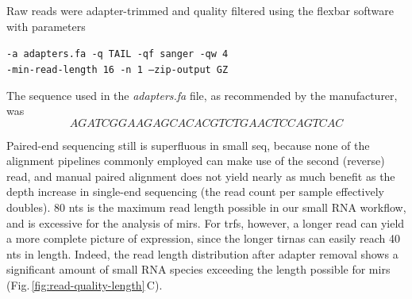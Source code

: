 \begin{method}

Raw reads were adapter-trimmed and quality filtered using the flexbar software\cite{Roehr2017} with parameters

\begin{center}\texttt{-a adapters.fa -q TAIL -qf sanger -qw 4 \\-min-read-length 16 -n 1 --zip-output GZ}\end{center} 

The sequence used in the \textit{adapters.fa} file, as recommended by the manufacturer, was $$AGATCGGAAGAGCACACGTCTGAACTCCAGTCAC$$ 

Paired-end sequencing still is superfluous in small \ac{seq}, because none of the alignment pipelines commonly employed can make use of the second (reverse) read, and manual paired alignment does not yield nearly as much benefit as the depth increase in single-end sequencing (the read count per sample effectively doubles). 80 \acp{nt} is the maximum read length possible in our small RNA workflow, and is excessive for the analysis of \acp{mir}. For \aclp{trf}, however, a longer read can yield a more complete picture of expression, since the longer \acp{tirna} can easily reach 40 \acp{nt} in length. Indeed, the read length distribution after adapter removal shows a significant amount of small RNA species exceeding the length possible for \acp{mir} (Fig.\,\ref{fig:read-quality-length}\,C). 

\end{method}


